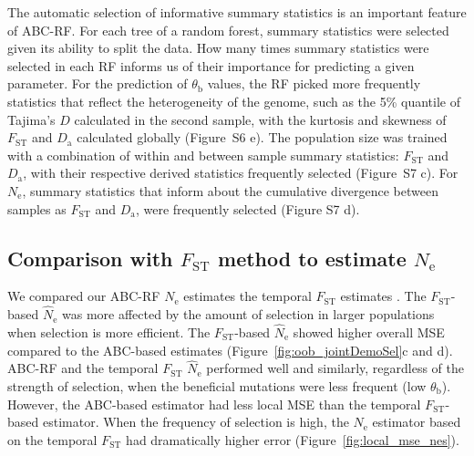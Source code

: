 \documentclass[a4paper, 12pt]{article}
\begin{document}
The automatic selection of informative summary statistics is an important feature of ABC-RF. For each tree of a random forest, summary statistics were selected given its ability to split the data. How many times summary statistics were selected in each RF informs us of their importance for predicting a given parameter. For the prediction of $\theta_{\mathrm{b}}$ values, the RF picked more frequently statistics that reflect the heterogeneity of the genome, such as the 5\% quantile of Tajima's $D$ calculated in the second sample, with the kurtosis and skewness of $F_{\mathrm{ST}}$ and $D_{\mathrm{a}}$ calculated globally (Figure~S6 e). The population size was trained with a combination of within and between sample summary statistics: $F_{\mathrm{ST}}$ and $D_{\mathrm{a}}$, with their respective derived statistics frequently selected (Figure~S7 c). For $N_{\mathrm{e}}$, summary statistics that inform about the cumulative divergence between samples as $F_{\mathrm{ST}}$ and $D_{\mathrm{a}}$, were frequently selected (Figure S7 d).

\subsection*{Comparison with $F_{\mathrm{ST}}$ method to estimate $N_\mathrm{e}$}

We compared our ABC-RF $N_\mathrm{e}$ estimates the temporal $F_\mathrm{ST}$ estimates \citep{Frachon:2017fw}. The $F_{\mathrm{ST}}$-based $\hat N_\mathrm{e}$ was more affected by the amount of selection in larger populations when selection is more efficient. The $F_{\mathrm{ST}}$-based $\hat N_\mathrm{e}$ showed higher overall MSE compared to the ABC-based estimates (Figure~\ref{fig:oob_jointDemoSel}c and d).  ABC-RF and the temporal $F_{\mathrm{ST}}$ $\hat N_\mathrm{e}$ performed well and similarly, regardless of the strength of selection, when the beneficial mutations were less frequent (low $\theta_{\mathrm{b}}$). However, the ABC-based estimator had less local MSE than the temporal $F_{\mathrm{ST}}$-based estimator. When the frequency of selection is high, the $N_{\mathrm{e}}$ estimator based on the temporal $F_{\mathrm{ST}}$ had dramatically higher error (Figure~\ref{fig:local_mse_nes}).
\end{document}
